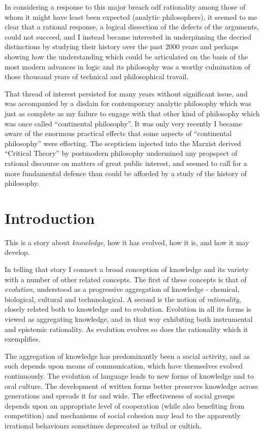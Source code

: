 \documentclass[10pt,titlepage]{book}
\begin{document}
In considering a response to this major breach odf rationality among those of whom it might have least been expected (analytic philosophers), it seemed to me clear that a rational response, a logical dissection of the defects of the arguments, could not succeed, and I instead became interested in underpinning the decried distinctions by studying their history over the past 2000 years and perhaps showing how the understanding which could be articulated on the basis of the most modern advances in logic and its philosophy was a worthy culmination of those thousand years of technical and philosophical travail.

That thread of interest persisted for many years without significant issue, and was accompanied by a disdain for contemporary analytic philosophy which was just as complete as my failure to engage with that other kind of philosophy which was once called ``continental philosophy''.
It was only very recently I became aware of the enormous practical effects that some aspects of ``continental philosophy'' were effecting.
The scepticism injected into the Marxist derived ``Critical Theory'' by postmodern philosophy undermined any propspect of rational discourse on matters of great public interest, and seemed to call for a more fundamental defence than could be afforded by a study of the history of philosophy.

\chapter{Introduction}

This is a story about \emph{knowledge}, how it has evolved, how it is, and how it may develop.

In telling that story I connect a broad conception of knowledge and its variety with a number of other related concepts.
The first of these concepts is that of \emph{evolution}, understood as a progressive aggregation of knowledge -  chemical, biological, cultural and technnological.
A second is the notion of \emph{rationality}, closely related both to knowledge and to evolution.
Evolution in all its forms is viewed as aggregating knowledge, and in that way exhibiting both instrumental and epistemic rationality.
As evolution evolves so does the rationality which it exemplifies.

The aggregation of knowledge has predominantly been a social activity, and as such depends upon means of communication, which have themselves evolved continuously.
The evolution of language leads to new forms of knowledge and to oral culture.
The development of written forms better preserves knowledge across generations and spreads it far and wide.
The effectiveness of social groups depends upon an appropriate level of cooperation (while also benefiting from competition) and mechanisms of social cohesion may lead to the apparently irrational behaviours sometimes deprecated as tribal or cultish.
\end{document}
